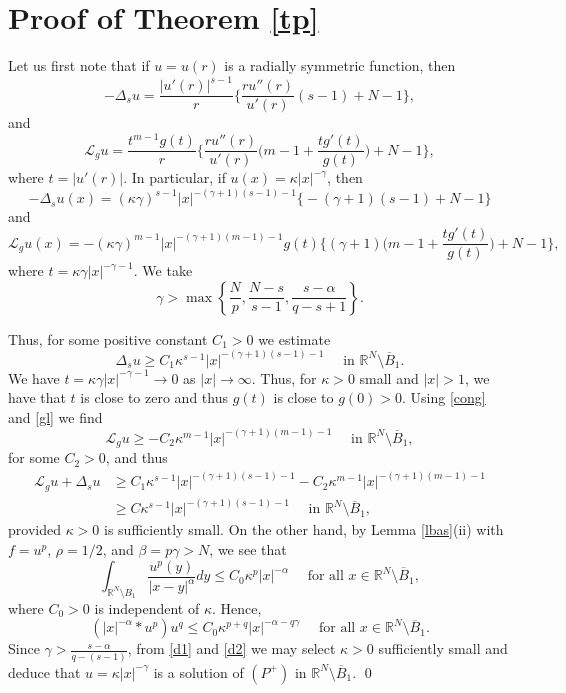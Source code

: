 \documentclass[10pt,a4paper]{amsart}
\numberwithin{equation}{section}
\newcommand{\R}{\mathbb R}
\newcommand{\Ro}{\mathbb R^N\setminus \overline B_1}
\newcommand{\Lg}{{\mathcal L}_g}
\begin{document}
\section{Proof of Theorem \ref{tp}}

Let us first note that if $u=u(r)$ is a radially symmetric function, then
\begin{equation}\label{sv}
-\Delta_s u=\frac{|u'(r)|^{s-1}}{r}\Big\{\frac{ru''(r)}{u'(r)}(s-1)+N-1\Big\},
\end{equation}
and 
\begin{equation}\label{gv}
\Lg u=\frac{t^{m-1}g(t)}{r}\Big\{\frac{ru''(r)}{u'(r)}\Big(m-1+\frac{tg'(t)}{g(t)}\Big)+N-1\Big\},
\end{equation}
where $t=|u'(r)|$. In particular, if $u(x)=\kappa |x|^{-\gamma}$, then 
\begin{equation}\label{sl}
-\Delta_s u(x)=(\kappa \gamma)^{s-1}|x|^{-(\gamma+1)(s-1)-1}\big\{-(\gamma+1)(s-1)+N-1\big\}
\end{equation}
and
\begin{equation}\label{gl}
\Lg u(x)=-(\kappa \gamma)^{m-1}|x|^{-(\gamma+1)(m-1)-1}g(t)\Big\{(\gamma+1)\Big(m-1+\frac{tg'(t)}{g(t)}\Big)+N-1\Big\},
\end{equation}
where $t=\kappa \gamma|x|^{-\gamma-1}$. We take
$$
\gamma>\max\left\{\frac{N}{p}, \frac{N-s}{s-1}, \frac{s-\alpha}{q-s+1}  \right\}.
$$



Thus, for some positive constant $C_1>0$ we estimate
$$
\Delta_s u\geq C_1\kappa^{s-1} |x|^{-(\gamma+1)(s-1)-1}\quad\mbox{ in }\Ro.
$$
We have $t=\kappa \gamma|x|^{-\gamma-1}\to 0$ as $|x|\to \infty$. Thus, for $\kappa>0$ small and $|x|>1$, we have that $t$ is close to zero and thus $g(t)$ is close to $g(0)>0$. Using \eqref{cong} and \eqref{gl} we find
$$
\Lg u\geq -C_2 \kappa^{m-1} |x|^{-(\gamma+1)(m-1)-1} \quad\mbox{ in }\Ro,
$$
for some $C_2>0$, and thus
\begin{equation}\label{d1}
\begin{aligned}
\Lg u+\Delta_s u &\geq C_1\kappa^{s-1} |x|^{-(\gamma+1)(s-1)-1}-C_2 \kappa^{m-1} |x|^{-(\gamma+1)(m-1)-1}\\
&\geq C \kappa^{s-1} |x|^{-(\gamma+1)(s-1)-1} \quad\mbox{ in }\Ro,
\end{aligned}
\end{equation}
provided $\kappa>0$ is sufficiently small. On the other hand, by 
Lemma \ref{lbas}(ii) with $f=u^p$, $\rho=1/2$, and $\beta=p\gamma>N$, we see that
$$
\int_{\R^N\setminus B_1}\frac{u^p(y)}{|x-y|^\alpha} dy\leq C_0\kappa^p |x|^{-\alpha}\quad\mbox{ for all }x\in \Ro,
$$
where $C_0>0$ is independent of $\kappa$.
Hence,
\begin{equation}\label{d2}
(|x|^{-\alpha}*u^p)u^q\leq C_0\kappa^{p+q} |x|^{-\alpha-q\gamma} \quad\mbox{ for all }x\in \Ro.
\end{equation}
Since $\gamma>\frac{s-\alpha}{q-(s-1)}$, from \eqref{d1} and \eqref{d2} we may select $\kappa>0$ sufficiently small and deduce that $u=\kappa|x|^{-\gamma}$ is a solution of $(P^+)$ in $\Ro$. 
\qed
\end{document}
